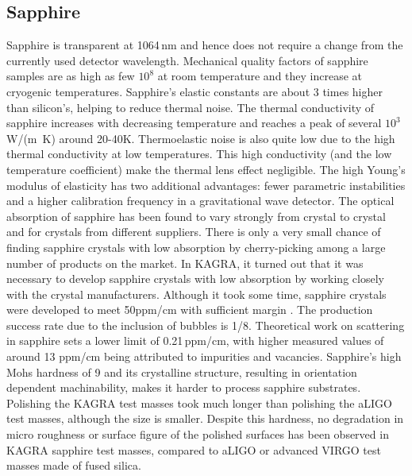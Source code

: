 \subsection{Sapphire}
Sapphire is transparent at 1064\,nm and hence does not require a change from the currently used detector wavelength. Mechanical quality factors of sapphire samples are as high as few $10^8$ at room temperature\cite{Rowan_2000a} and they increase at cryogenic temperatures\cite{uchiyama1999mechanical}. 
Sapphire's elastic constants are about 3 times higher than silicon's, helping to reduce thermal noise. The thermal conductivity of sapphire increases with decreasing temperature and reaches a peak of several $10^3$\,W/(m \,K) around 20-40K.  Thermoelastic noise is also quite low due to the high thermal conductivity at low temperatures.  This high conductivity (and the low temperature coefficient) make the thermal lens effect negligible. The high Young's modulus of elasticity has two additional advantages: fewer parametric instabilities and a higher calibration frequency in a gravitational wave detector.
The optical absorption of sapphire has been found to vary strongly from crystal to crystal and for crystals from different suppliers. There is only a very small chance of finding sapphire crystals with low absorption by cherry-picking among a large number of products on the market. In KAGRA, it turned out that it was necessary to develop sapphire crystals with low absorption by working closely with the crystal manufacturers. Although it took some time, sapphire crystals were developed to meet 50ppm/cm with sufficient margin \cite{Hirose_2014a}. The production success rate due to the inclusion of bubbles is 1/8.
Theoretical work on scattering in sapphire sets a lower limit of 0.21\,ppm/cm, with higher measured values of around 13 ppm/cm being attributed to impurities and vacancies.
Sapphire's high Mohs hardness of 9 and its crystalline structure, resulting in orientation dependent machinability, makes it harder to process sapphire substrates. Polishing the KAGRA test masses took much longer than polishing the aLIGO test masses, although the size is smaller. Despite this hardness, no degradation in micro roughness or surface figure of the polished surfaces has been observed in KAGRA sapphire test masses\cite{Hirose_2014a}, compared to aLIGO or advanced VIRGO test masses made of fused silica. 
